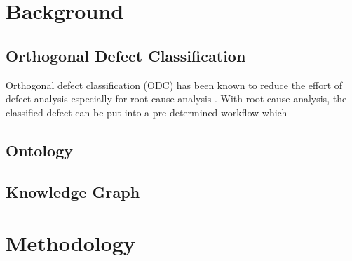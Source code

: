 \documentclass[12pt] {article}
\begin{document}
\section{Background}
\subsection{Orthogonal Defect Classification}
Orthogonal defect classification (ODC) has been known to reduce the effort of defect analysis especially for root cause analysis \cite{buglione2006introducing}.
With root cause analysis, the classified defect can be put into a pre-determined workflow which    
\subsection{Ontology}
\subsection{Knowledge Graph}

\section{Methodology}

\pagebreak
\end{document}

